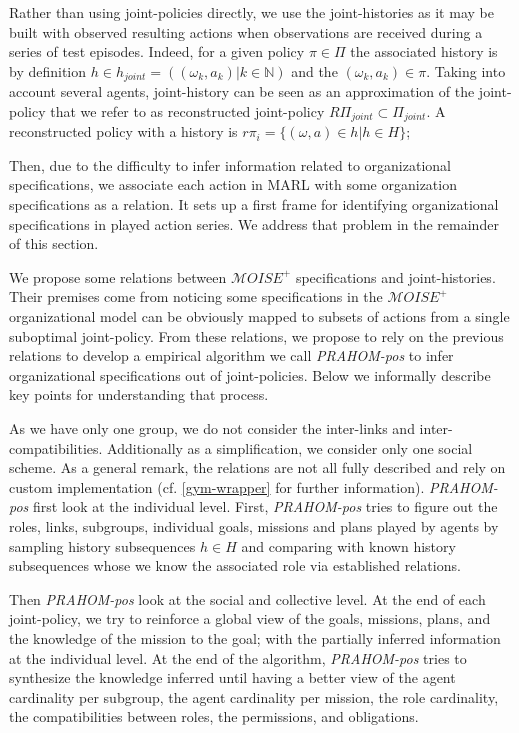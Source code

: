 \documentclass[runningheads]{llncs}
\newcounter{relation}
\begin{document}
Rather than using joint-policies directly, we use the joint-histories as it may be built with observed resulting actions when observations are received during a series of test episodes. Indeed, for a given policy $\pi \in \Pi$ the associated history is by definition $h \in h_{joint} = ((\omega_k,a_k) | k \in \mathbb{N})$ and the $(\omega_k,a_k) \in \pi$. Taking into account several agents, joint-history can be seen as an approximation of the joint-policy that we refer to as reconstructed joint-policy $R\Pi_{joint} \subset \Pi_{joint}$. A reconstructed policy with a history is $r\pi_i = \{(\omega, a) \in h | h \in H\}$;

Then, due to the difficulty to infer information related to organizational specifications, we associate each action in MARL with some organization specifications as a  relation. It sets up a first frame for identifying organizational specifications in played action series. We address that problem in the remainder of this section.

We propose some relations between $\mathcal{M}OISE^+$ specifications and joint-histories. Their premises come from noticing some specifications in the $\mathcal{M}OISE^+$ organizational model can be obviously mapped to subsets of actions from a single suboptimal joint-policy.
From these relations, we propose to rely on the previous relations to develop a empirical algorithm we call \emph{PRAHOM-pos} to infer organizational specifications out of joint-policies. Below we informally describe key points for understanding that process.

As we have only one group, we do not consider the inter-links and inter-compatibilities. Additionally as a simplification, we consider only one social scheme. As a general remark, the  relations are not all fully described and rely on custom implementation (cf. \autoref{gym-wrapper} for further information).
\emph{PRAHOM-pos} first look at the individual level.
First, \emph{PRAHOM-pos} tries to figure out the roles, links, subgroups, individual goals, missions and plans played by agents by sampling history subsequences $h \in H$ and comparing with known history subsequences whose we know the associated role via established relations.

Then \emph{PRAHOM-pos} look at the social and collective level.
At the end of each joint-policy, we try to reinforce a global view of the goals, missions, plans, and the knowledge of the mission to the goal; with the partially inferred information at the individual level.
At the end of the algorithm, \emph{PRAHOM-pos} tries to synthesize the knowledge inferred until having a better view of the agent cardinality per subgroup, the agent cardinality per mission, the role cardinality, the compatibilities between roles, the permissions, and obligations.
\end{document}
